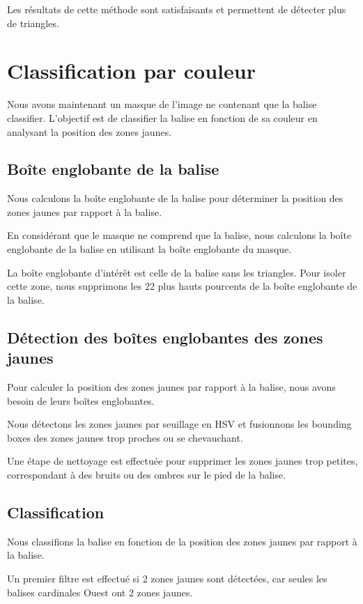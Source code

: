 \documentclass{article}
\begin{document}
Les résultats de cette méthode sont satisfaisants et permettent de détecter
plus de triangles.

\section{Classification par couleur}

Nous avons maintenant un masque de l'image ne contenant que la balise
classifier. L'objectif est de classifier la balise en fonction de sa couleur en
analysant la position des zones jaunes.

\subsection{Boîte englobante de la balise}

Nous calculons la boîte englobante de la balise pour déterminer la position des
zones jaunes par rapport à la balise.

En considérant que le masque ne comprend que la balise, nous calculons la boîte
englobante de la balise en utilisant la boîte englobante du masque.

La boîte englobante d'intérêt est celle de la balise sans les triangles. Pour
isoler cette zone, nous supprimons les 22 plus hauts pourcents de la boîte
englobante de la balise.

\subsection{Détection des boîtes englobantes des zones jaunes}

Pour calculer la position des zones jaunes par rapport à la balise, nous avons
besoin de leurs boîtes englobantes.

Nous détectons les zones jaunes par seuillage en HSV et fusionnons les bounding
boxes des zones jaunes trop proches ou se chevauchant.

Une étape de nettoyage est effectuée pour supprimer les zones jaunes trop
petites, correspondant à des bruits ou des ombres sur le pied de la balise.

\subsection{Classification}

Nous classifions la balise en fonction de la position des zones jaunes par
rapport à la balise.

Un premier filtre est effectué si 2 zones jaunes sont détectées, car seules les
balises cardinales Ouest ont 2 zones jaunes.
\end{document}
